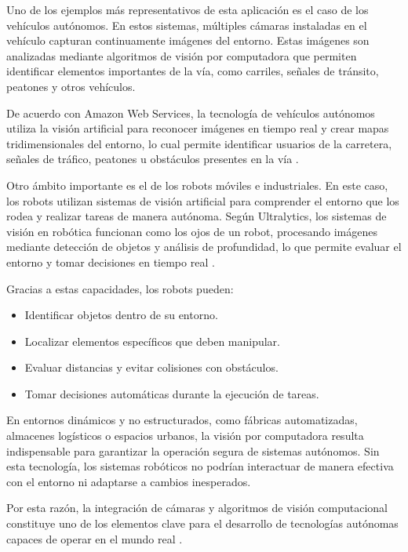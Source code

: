 Uno de los ejemplos más representativos de esta aplicación es el caso de los vehículos autónomos. En estos sistemas, múltiples cámaras instaladas en el vehículo capturan continuamente imágenes del entorno. Estas imágenes son analizadas mediante algoritmos de visión por computadora que permiten identificar elementos importantes de la vía, como carriles, señales de tránsito, peatones y otros vehículos.

De acuerdo con Amazon Web Services, la tecnología de vehículos autónomos utiliza la visión artificial para reconocer imágenes en tiempo real y crear mapas tridimensionales del entorno, lo cual permite identificar usuarios de la carretera, señales de tráfico, peatones u obstáculos presentes en la vía \cite{aws_computervision}.

Otro ámbito importante es el de los robots móviles e industriales. En este caso, los robots utilizan sistemas de visión artificial para comprender el entorno que los rodea y realizar tareas de manera autónoma. Según Ultralytics, los sistemas de visión en robótica funcionan como los ojos de un robot, procesando imágenes mediante detección de objetos y análisis de profundidad, lo que permite evaluar el entorno y tomar decisiones en tiempo real \cite{ultralytics_robotics_cv}.

Gracias a estas capacidades, los robots pueden:
\begin{itemize}
    \item Identificar objetos dentro de su entorno.
    \item Localizar elementos específicos que deben manipular.
    \item Evaluar distancias y evitar colisiones con obstáculos.
    \item Tomar decisiones automáticas durante la ejecución de tareas.
\end{itemize}

En entornos dinámicos y no estructurados, como fábricas automatizadas, almacenes logísticos o espacios urbanos, la visión por computadora resulta indispensable para garantizar la operación segura de sistemas autónomos. Sin esta tecnología, los sistemas robóticos no podrían interactuar de manera efectiva con el entorno ni adaptarse a cambios inesperados.

Por esta razón, la integración de cámaras y algoritmos de visión computacional constituye uno de los elementos clave para el desarrollo de tecnologías autónomas capaces de operar en el mundo real \cite{aws_computervision}\cite{ultralytics_robotics_cv}\cite{ultralytics_robotics_cv}.

